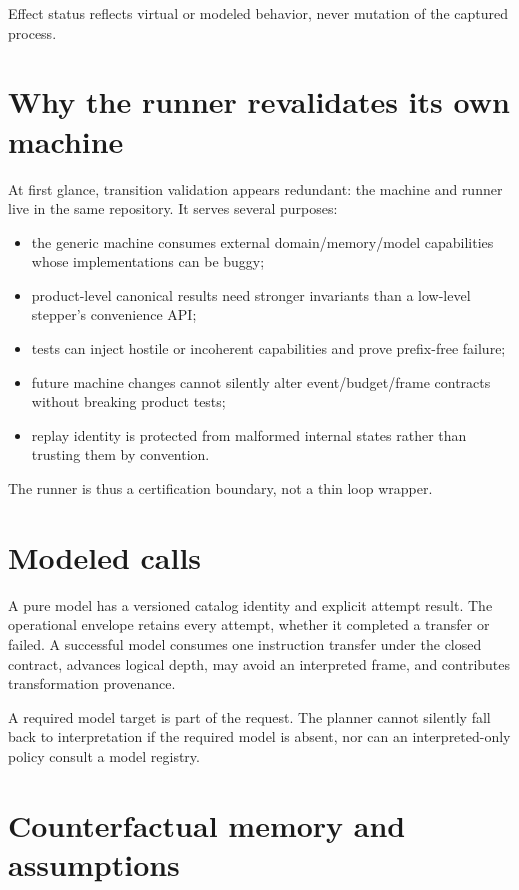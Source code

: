 \documentclass[11pt,oneside,openany]{book}
\begin{document}
Effect status reflects virtual or modeled behavior, never mutation of the captured process.

\section{Why the runner revalidates its own machine}

At first glance, transition validation appears redundant: the machine and runner live in the same repository. It serves several purposes:

\begin{itemize}
  \item the generic machine consumes external domain/memory/model capabilities whose implementations can be buggy;
  \item product-level canonical results need stronger invariants than a low-level stepper's convenience API;
  \item tests can inject hostile or incoherent capabilities and prove prefix-free failure;
  \item future machine changes cannot silently alter event/budget/frame contracts without breaking product tests;
  \item replay identity is protected from malformed internal states rather than trusting them by convention.
\end{itemize}

The runner is thus a certification boundary, not a thin loop wrapper.

\section{Modeled calls}

A pure model has a versioned catalog identity and explicit attempt result. The operational envelope retains every attempt, whether it completed a transfer or failed. A successful model consumes one instruction transfer under the closed contract, advances logical depth, may avoid an interpreted frame, and contributes transformation provenance.

A required model target is part of the request. The planner cannot silently fall back to interpretation if the required model is absent, nor can an interpreted-only policy consult a model registry.

\section{Counterfactual memory and assumptions}
\end{document}
